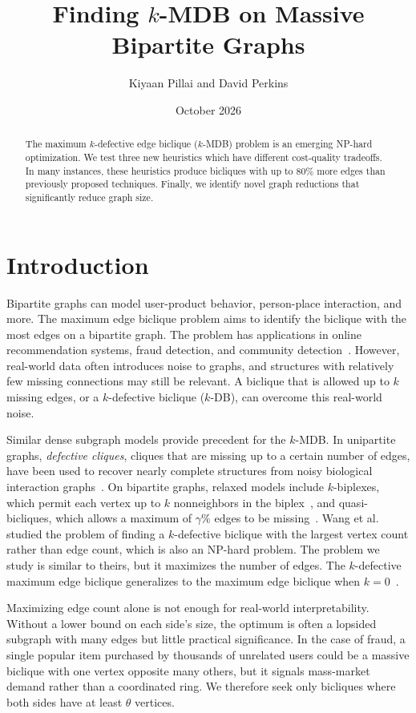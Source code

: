\documentclass[conference]{IEEEtran}
\title{Finding $k$-MDB on Massive Bipartite Graphs}
\author{Kiyaan Pillai and David Perkins}
\date{October 2026}
\begin{document}
\maketitle

\begin{abstract}
The maximum $k$-defective edge biclique ($k$-MDB) problem is an emerging NP-hard optimization. We test three new heuristics which have different cost-quality tradeoffs. In many instances, these heuristics produce bicliques with up to $80\%$ more edges than previously proposed techniques. Finally, we identify novel graph reductions that significantly reduce graph size.
\end{abstract}

\section{Introduction}

Bipartite graphs can model user-product behavior, person-place interaction, and more. The maximum edge biclique problem aims to identify the biclique with the most edges on a bipartite graph. The problem has applications in online recommendation systems, fraud detection, and community detection~\cite{cui}. However, real-world data often introduces noise to graphs, and structures with relatively few missing connections may still be relevant. A biclique that is allowed up to $k$ missing edges, or a $k$-defective biclique ($k$-DB), can overcome this real-world noise.

Similar dense subgraph models provide precedent for the $k$-MDB. In unipartite graphs, \emph{defective cliques}, cliques that are missing up to a certain number of edges, have been used to recover nearly complete structures from noisy biological interaction graphs~\cite{yu2006}. On bipartite graphs, relaxed models include $k$-biplexes, which permit each vertex up to $k$ nonneighbors in the biplex~\cite{yu2023}, and quasi-bicliques, which allows a maximum of $\gamma\%$ edges to be missing~\cite{TODO_quasi_biclique}. Wang et al.~\cite{wang2025} studied the problem of finding a $k$-defective biclique with the largest vertex count rather than edge count, which is also an NP-hard problem. The problem we study is similar to theirs, but it maximizes the number of edges. The $k$-defective maximum edge biclique generalizes to the maximum edge biclique when $k = 0$~\cite{cui,wang2025}.

Maximizing edge count alone is not enough for real-world interpretability. Without a lower bound on each side's size, the optimum is often a lopsided subgraph with many edges but little practical significance. In the case of fraud, a single popular item purchased by thousands of unrelated users could be a massive biclique with one vertex opposite many others, but it signals mass-market demand rather than a coordinated ring. We therefore seek only bicliques where both sides have at least $\theta$ vertices.
\end{document}
